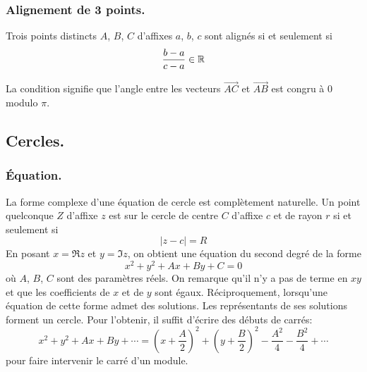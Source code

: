 \subsubsection{Alignement de 3 points.}
\begin{prop}
  Trois points distincts $A$, $B$, $C$ d'affixes $a$, $b$, $c$ sont alignés si et seulement si
  \begin{displaymath}
    \frac{b-a}{c-a} \in \mathbb{R}
  \end{displaymath}
\end{prop}
\begin{demo}
  La condition signifie que l'angle entre les vecteurs $\overrightarrow{AC}$ et $\overrightarrow{AB}$ est congru à $0$ modulo $\pi$.
\end{demo}


\subsection{Cercles.}
\subsubsection{\'Equation.}
La forme complexe d'une équation de cercle est complètement naturelle. Un point quelconque $Z$ d'affixe $z$ est sur le cercle de centre $C$ d'affixe $c$ et de rayon $r$ si et seulement si 
\begin{displaymath}
 |z-c| = R
\end{displaymath}
En posant $x=\Re z$ et $y = \Im z$, on obtient une équation du second degré de la forme 
\begin{displaymath}
  x^2 + y ^2 + A x + By + C = 0
\end{displaymath}
où $A$, $B$, $C$ sont des paramètres réels. On remarque qu'il n'y a pas de terme en $xy$ et que les coefficients de $x$ et de $y$ sont égaux.\newline
Réciproquement, lorsqu'une équation de cette forme admet des solutions. Les représentants de ses solutions forment un cercle. Pour l'obtenir, il suffit d'écrire des débuts de carrés:
\begin{displaymath}
x^2 + y^2 + Ax + By + \cdots = (x+\frac{A}{2})^2 + (y+\frac{B}{2})^2 -\frac{A^2}{4} - \frac{B^2}{4} + \cdots  
\end{displaymath}
pour faire intervenir le carré d'un module.

